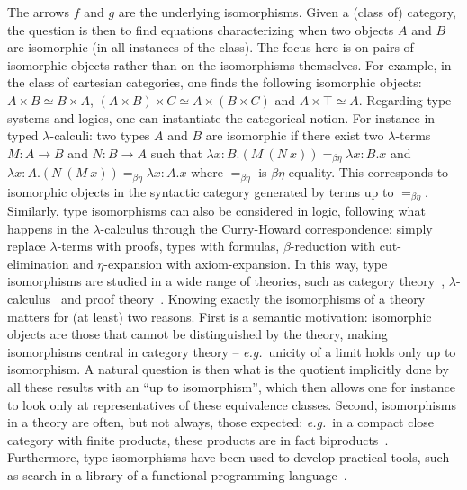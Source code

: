 \documentclass{lmcs}
\newcommand*{\eg}{\emph{e.g.}}
\newcommand*{\iso}{\mathrel{\simeq}} %
\newcommand*{\eqeq}{=} %
\newcommand{\eqbn}{\mathrel{\eqeq_{\beta\eta}}}
\newcommand*{\id}[1]{\ensuremath{\textnormal{id}_{#1}}}
\begin{document}
\begin{adjustbox}{}
\end{adjustbox}
The arrows $f$ and $g$ are the underlying isomorphisms.
Given a (class of) category, the question is then to find equations characterizing when two objects $A$ and $B$ are isomorphic (in all instances of the class).
The focus here is on pairs of isomorphic objects rather than on the isomorphisms themselves.
For example, in the class of cartesian categories, one finds the following isomorphic objects: $A\times B\iso B\times A$, $(A\times B)\times C\iso A\times(B\times C)$ and $A\times\top\iso A$.
Regarding type systems and logics, one can instantiate the categorical notion.
For instance in typed $\lambda$-calculi: two types $A$ and $B$ are isomorphic if there exist two $\lambda$-terms $M:A\rightarrow B$ and $N:B\rightarrow A$ such that $\lambda x:B.(M~(N~x))\eqbn \lambda x:B.x$ and $\lambda x:A.(N~(M~x))\eqbn \lambda x:A.x$ where $\eqbn$ is $\beta\eta$-equality.
This corresponds to isomorphic objects in the syntactic category generated by terms up to $\eqbn$.
Similarly, type isomorphisms can also be considered in logic, following what happens in the $\lambda$-calculus through the Curry-Howard correspondence: simply replace $\lambda$-terms with proofs, types with formulas, $\beta$-reduction with cut-elimination and $\eta$-expansion with axiom-expansion.
In this way, type isomorphisms are studied in a wide range of theories, such as category theory~\cite{isosoloviev,isossmcc}, $\lambda$-calculus~\cite{isotypes} and proof theory~\cite{mllisos}.
Knowing exactly the isomorphisms of a theory matters for (at least) two reasons.
First is a semantic motivation: isomorphic objects are those that cannot be distinguished by the theory, making isomorphisms central in category theory -- \eg\ unicity of a limit holds only up to isomorphism.
A natural question is then what is the quotient implicitly done by all these results with an ``up to isomorphism'', which then allows one for instance to look only at representatives of these equivalence classes.
Second, isomorphisms in a theory are often, but not always, those expected: \eg\ in a compact close category with finite products, these products are in fact biproducts~\cite{prodccc}.
Furthermore, type isomorphisms have been used to develop practical tools, such as search in a library of a functional programming language~\cite{isosearch,isosearchradanne}.
\end{document}
